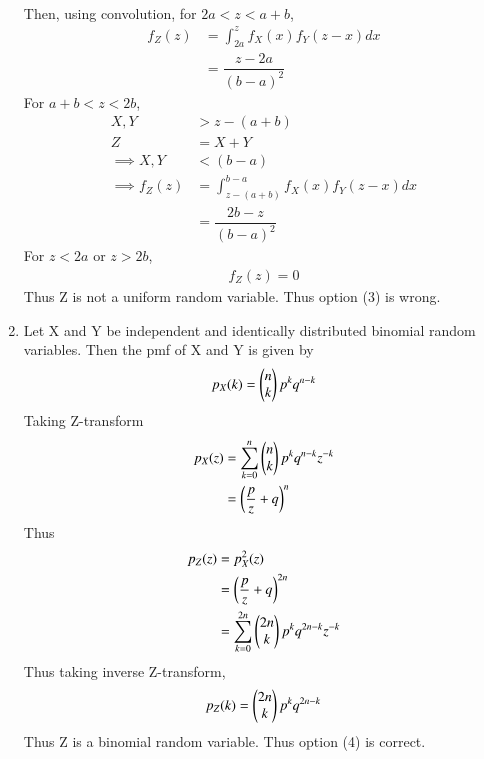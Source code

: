 \documentclass[journal,12pt,twocolumn]{IEEEtran}
\begin{document}
\begin{enumerate}[label = \arabic*)]
\begin{align}
    \end{align}
    Then, using convolution, for $2a<z<a+b$, 
    \begin{align}
        f_Z(z) &= \int_{2a}^z f_X(x)f_Y(z-x) dx\\
               &= \dfrac{z-2a}{(b-a)^2}
    \end{align}
    For $a+b<z<2b$,
    \begin{align}
        X,Y &> z - (a+b)\\
        Z &= X+Y\\
        \implies X,Y &< (b-a)\\
        \implies f_Z(z) &= \int_{z-(a+b)}^{b-a} f_X(x)f_Y(z-x)dx\\
                        &= \dfrac{2b-z}{(b-a)^2}
    \end{align}
    For $z<2a$ or $z>2b$, 
    \begin{align}
        f_Z(z) = 0
    \end{align}
    Thus Z is not a uniform random variable. Thus option (3) is wrong.
    \item Let X and Y be independent and identically distributed binomial random variables. Then the pmf of X and Y is given by
    \begin{align}
        p_X(k) = \begin{pmatrix}n\\k\end{pmatrix}p^k q^{n-k}
    \end{align}
    Taking Z-transform
    \begin{align}
        p_X(z) &= \sum_{k=0}^n \begin{pmatrix}n\\k\end{pmatrix} p^k q^{n-k} z^{-k}\\
               &= \left(\dfrac{p}{z}+q \right)^n
    \end{align}
    Thus
    \begin{align}
        p_Z(z) &= p_X^2(z)\\
               &= \left(\dfrac{p}{z}+q \right)^{2n}\\
               &= \sum_{k=0}^{2n} \begin{pmatrix}2n\\k\end{pmatrix} p^k q^{2n-k} z^{-k}
    \end{align}
    Thus taking inverse Z-transform, 
    \begin{align}
        p_Z(k) = \begin{pmatrix}2n\\k\end{pmatrix} p^k q^{2n-k}
    \end{align}
    Thus Z is a binomial random variable. Thus option (4) is correct.
\end{enumerate}
\end{document}
